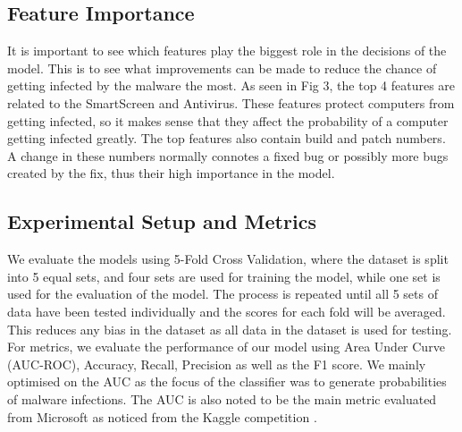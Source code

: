 \documentclass[runningheads]{llncs}
\begin{document}
\subsection{Feature Importance} It is important to see which features play the biggest role in the decisions of the model. This is to see what improvements can be made to reduce the chance of getting infected by the malware the most. As seen in Fig 3, the top 4 features are related to the SmartScreen and Antivirus. These features protect computers from getting infected, so it makes sense that they affect the probability of a computer getting infected greatly. The top features also contain build and patch numbers. A change in these numbers normally connotes a fixed bug or possibly more bugs created by the fix, thus their high importance in the model. 
\subsection{Experimental Setup and Metrics}We evaluate the models using 5-Fold Cross Validation, where the dataset is split into 5 equal sets, and four sets are used for training the model, while one set is used for the evaluation of the model. The process is repeated until all 5 sets of data have been tested individually and the scores for each fold will be averaged. This reduces any bias in the dataset as all data in the dataset is used for testing. For metrics, we evaluate the performance of our model using Area Under Curve (AUC-ROC), Accuracy, Recall, Precision as well as the F1 score. We mainly optimised on the AUC as the focus of the classifier was to generate probabilities of malware infections. The AUC is also noted to be the main metric evaluated from Microsoft as noticed from the Kaggle competition \cite{microsoft-malware-prediction}. 

\end{document}
